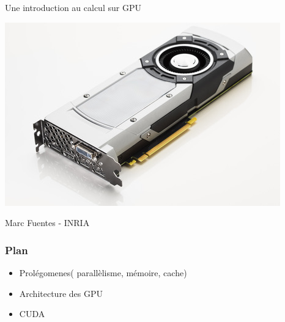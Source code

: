 \documentclass[11pt,mathserif]{beamer}
\begin{document}
\begin{frame}
\begin{center}
{\Large Une introduction au calcul sur GPU} 
\end{center}
\begin{center}
\includegraphics[width=0.5\linewidth]{gpu.jpg}
\end{center}
\begin{center}
{\large Marc Fuentes - INRIA \\ }
\end{center}
\end{frame}


\begin{frame}
\frametitle{Plan}

\begin{itemize}[<+->]
\item Prolégomenes( parallèlisme, mémoire, cache)
\item Architecture des GPU
\item CUDA
\end{itemize}
\end{frame}
\end{document}
